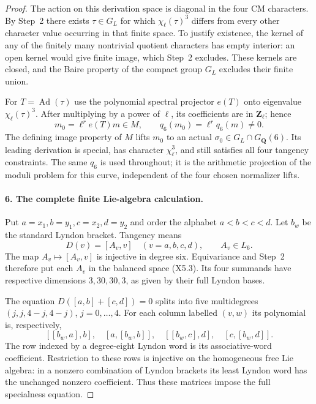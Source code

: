 \begin{proof}
The action on this derivation space is diagonal in the
four CM characters. By Step~2 there exists
$\tau\in G_L$ for which $\chi_\ell(\tau)^3$ differs from
every other character value occurring in that finite
space. To justify existence, the kernel of any of the
finitely many nontrivial quotient characters has empty
interior: an open kernel would give finite image, which
Step~2 excludes. These kernels are closed, and the Baire
property of the compact group $G_L$ excludes their finite
union.

For $T=\operatorname{Ad}(\tau)$ use the polynomial
spectral projector $e(T)$ onto eigenvalue
$\chi_\ell(\tau)^3$. After multiplying by a power of
$\ell$, its coefficients are in $\mathbf Z_\ell$; hence
\[
 m_0=\ell^r e(T)m\in M,\qquad
 q_6(m_0)=\ell^r q_6(m)\ne0.
 \tag{X5.7}
\]
The defining image property of $M$ lifts $m_0$ to an actual
$\sigma_0\in G_L\cap G_{\mathbf Q}(6)$. Its leading
derivation is special, has character $\chi_\ell^3$, and
still satisfies all four tangency constraints. The same
$q_6$ is used throughout; it is the arithmetic projection
of the moduli problem for this curve, independent of the
four chosen normalizer lifts.

\paragraph{6. The complete finite Lie-algebra calculation.}
Put $a=x_1,b=y_1,c=x_2,d=y_2$ and order the alphabet
$a<b<c<d$. Let $b_w$ be the standard Lyndon bracket.
Tangency means
\[
 D(v)=[A_v,v]\quad(v=a,b,c,d),\qquad A_v\in L_6.
\]
The map $A_v\mapsto[A_v,v]$ is injective in degree six.
Equivariance and Step~2 therefore put each $A_v$ in the
balanced space (X5.3). Its four summands have respective
dimensions $3,30,30,3$, as given by their full Lyndon bases.

The equation $D([a,b]+[c,d])=0$ splits into five
multidegrees $(j,j,4-j,4-j)$, $j=0,\ldots,4$. For each
column labelled $(v,w)$ its polynomial is, respectively,
\[
 [[b_w,a],b],\quad [a,[b_w,b]],\quad
 [[b_w,c],d],\quad [c,[b_w,d]].
\]
The row indexed by a degree-eight Lyndon word is its
associative-word coefficient. Restriction to these rows
is injective on the homogeneous free Lie algebra: in a
nonzero combination of Lyndon brackets its least Lyndon
word has the unchanged nonzero coefficient. Thus these
matrices impose the full specialness equation.


\end{proof}
